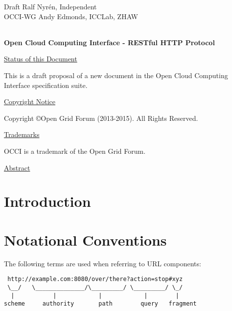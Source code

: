 \documentclass[10pt,a4paper]{article}
\begin{document}
\thispagestyle{empty}

Draft \hfill Ralf Nyrén, Independent \\
OCCI-WG \hfill Andy Edmonds, ICCLab, ZHAW \\
\\

\vspace*{0.5in}

\begin{Large}
\textbf{Open Cloud Computing Interface - RESTful HTTP Protocol}
\end{Large}

\vspace*{0.5in}

\underline{Status of this Document}

%
This is a draft proposal of a new document in the Open Cloud Computing
Interface specification suite.

\underline{Copyright Notice}

Copyright \copyright Open Grid Forum (2013-2015). All Rights Reserved.

\underline{Trademarks}

OCCI is a trademark of the Open Grid Forum.

\underline{Abstract}




\newpage
\tableofcontents
\newpage

\section{Introduction}


\section{Notational Conventions}


The following terms \cite{rfc3986} are used when referring to URL
components:

\begin{verbatim}
 http://example.com:8080/over/there?action=stop#xyz
 \__/   \______________/\_________/ \_________/ \_/
  |           |            |            |        |
scheme     authority       path        query   fragment
\end{verbatim}
\end{document}
